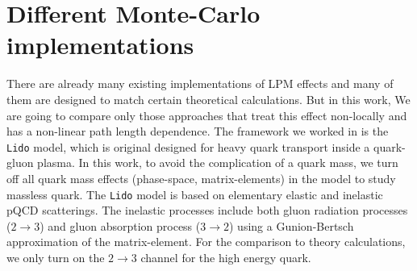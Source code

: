 \documentclass[aps, prc, reprint, amsmath, groupedaddress, nofootinbib]{revtex4-1}
\begin{document}
\section{Different Monte-Carlo implementations}
There are already many existing implementations of LPM effects and many of them are designed to match certain theoretical calculations. 
But in this work, We are going to compare only those approaches that treat this effect non-locally and has a non-linear path length dependence.
The framework we worked in is the {\tt Lido} model, which is original designed for heavy quark transport inside a quark-gluon plasma. 
In this work, to avoid the complication of a quark mass, we turn off all quark mass effects (phase-space, matrix-elements) in the model to study massless quark.
The {\tt Lido} model is based on elementary elastic and inelastic pQCD scatterings. 
The inelastic processes include both gluon radiation processes ($2\rightarrow 3$) and gluon absorption process ($3\rightarrow 2$) using a Gunion-Bertsch approximation of the matrix-element.
For the comparison to theory calculations, we only turn on the $2\rightarrow 3$ channel for the high energy quark.
\end{document}
